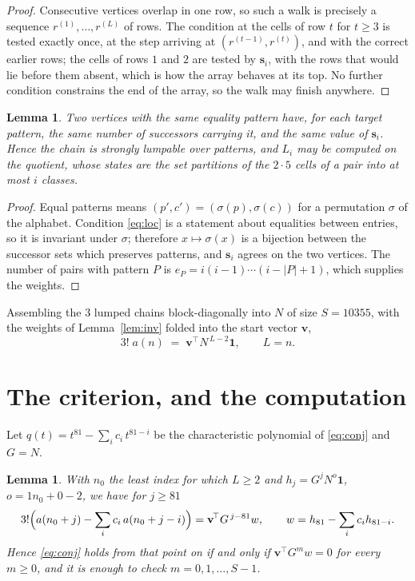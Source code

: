 \documentclass[11pt,a4paper]{article}
\theoremstyle{plain}
\newtheorem{lemma}[theorem]{Lemma}
\theoremstyle{definition}
\begin{document}
\begin{proof}
Consecutive vertices overlap in one row, so such a walk is precisely a sequence
$r^{(1)},\dots,r^{(L)}$ of rows. The condition at the cells of row $t$ for $t\ge3$
is tested exactly once, at the step arriving at $(r^{(t-1)},r^{(t)})$, and with the
correct earlier rows; the cells of rows $1$ and $2$ are tested by $\mathbf{s}_i$, with
the rows that would lie before them absent, which is how the array behaves at its top. No
further condition constrains the end of the array, so the walk may finish anywhere.
\end{proof}

\begin{lemma}\label{lem:lump}
Two vertices with the same equality pattern have, for each target pattern, the same number of
successors carrying it, and the same value of $\mathbf{s}_i$. Hence the chain is strongly
lumpable over patterns, and $L_i$ may be computed on the quotient, whose states are the set
partitions of the $2\cdot5$ cells of a pair into at most $i$ classes.
\end{lemma}

\begin{proof}
Equal patterns means $(p',c')=(\sigma(p),\sigma(c))$ for a permutation $\sigma$ of the
alphabet. Condition \eqref{eq:loc} is a statement about equalities between entries, so it is
invariant under $\sigma$; therefore $x\mapsto\sigma(x)$ is a bijection between the successor
sets which preserves patterns, and $\mathbf{s}_i$ agrees on the two vertices. The number of
pairs with pattern $P$ is $e_P=i(i-1)\cdots(i-|P|+1)$, which supplies the weights.
\end{proof}

Assembling the $3$ lumped chains block-diagonally into $N$ of size $S=10355$, with the
weights of Lemma~\ref{lem:inv} folded into the start vector $\mathbf{v}$,
\begin{equation}\label{eq:walk2}
3!\;a(n)\;=\;\mathbf{v}^{\!\top}N^{\,L-2}\mathbf{1},\qquad L=n .
\end{equation}

\section{The criterion, and the computation}

Let $q(t)=t^{81}-\sum_i c_i\,t^{81-i}$ be the characteristic polynomial of
\eqref{eq:conj} and $G=N$.

\begin{lemma}\label{lem:crit}
With $n_0$ the least index for which $L\ge2$ and $h_j=G^{j}N^{o}\mathbf{1}$,
$o=1n_0+0-2$, we have for $j\ge81$
\[
3!\Bigl(a(n_0+j)-\sum_i c_i\,a(n_0+j-i)\Bigr)
=\mathbf{v}^{\!\top}G^{\,j-81}w,\qquad
w=h_{81}-\sum_i c_i h_{81-i} .
\]
Hence \eqref{eq:conj} holds from that point on if and only if
$\mathbf{v}^{\!\top}G^{m}w=0$ for every $m\ge0$, and it is enough to check
$m=0,1,\dots,S-1$.
\end{lemma}
\end{document}
